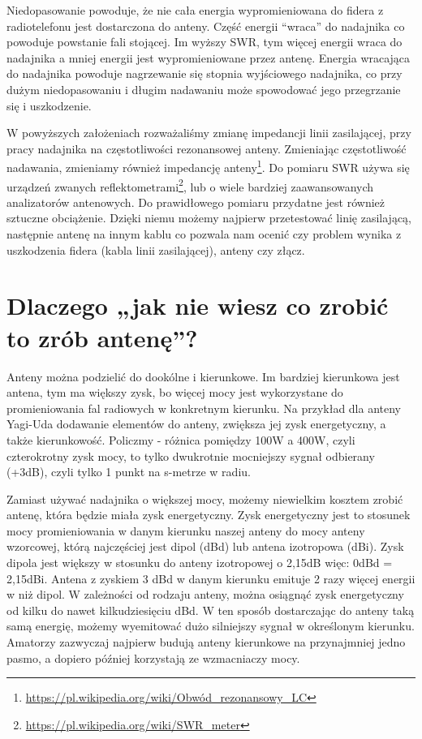 \documentclass[a4paper,12pt]{article}
\begin{document}
Niedopasowanie powoduje, że nie cała energia wypromieniowana do fidera z radiotelefonu jest dostarczona do anteny. Część energii “wraca” do nadajnika co powoduje powstanie fali stojącej. Im wyższy SWR, tym więcej energii wraca do nadajnika a mniej energii jest wypromieniowane przez antenę. Energia wracająca do nadajnika powoduje nagrzewanie się stopnia wyjściowego nadajnika, co przy dużym niedopasowaniu i długim nadawaniu może spowodować jego przegrzanie się i uszkodzenie.

W powyższych założeniach rozważaliśmy zmianę impedancji linii zasilającej, przy pracy nadajnika na częstotliwości rezonansowej anteny. Zmieniając częstotliwość nadawania, zmieniamy również impedancję anteny\footnote{\url{https://pl.wikipedia.org/wiki/Obwód_rezonansowy_LC}}.
Do pomiaru SWR używa się urządzeń zwanych reflektometrami\footnote{\url{https://pl.wikipedia.org/wiki/SWR_meter}}, lub o wiele bardziej zaawansowanych analizatorów antenowych.
Do prawidłowego pomiaru przydatne jest również sztuczne obciążenie. Dzięki niemu możemy najpierw przetestować linię zasilającą, następnie antenę na innym kablu co pozwala nam ocenić czy problem wynika z uszkodzenia fidera (kabla linii zasilającej), anteny czy złącz.

\section{Dlaczego „jak nie wiesz co zrobić to zrób antenę”?}
Anteny można podzielić do dookólne i kierunkowe. Im bardziej kierunkowa jest antena, tym ma większy zysk, bo więcej mocy jest wykorzystane do promieniowania fal radiowych w konkretnym kierunku. Na przykład dla anteny Yagi-Uda dodawanie elementów do anteny, zwiększa jej zysk energetyczny, a także kierunkowość.
Policzmy - różnica pomiędzy 100W a 400W, czyli czterokrotny zysk mocy, to tylko dwukrotnie mocniejszy sygnał odbierany (+3dB), czyli tylko 1 punkt na s-metrze w radiu. 

Zamiast używać nadajnika o większej mocy, możemy niewielkim kosztem zrobić antenę, która będzie miała zysk energetyczny. Zysk energetyczny jest to stosunek mocy promieniowania w danym kierunku naszej anteny do mocy anteny wzorcowej, którą najczęściej jest dipol (dBd) lub antena izotropowa (dBi). Zysk dipola jest większy w stosunku do anteny izotropowej o 2,15dB więc: 0dBd = 2,15dBi. Antena z zyskiem 3 dBd w danym kierunku emituje 2 razy więcej energii w niż dipol. W zależności od rodzaju anteny, można osiągnąć zysk energetyczny od kilku do nawet kilkudziesięciu dBd. W ten sposób dostarczając do anteny taką samą energię, możemy wyemitować dużo silniejszy sygnał w określonym kierunku. Amatorzy zazwyczaj najpierw budują anteny kierunkowe na przynajmniej jedno pasmo, a dopiero później korzystają ze wzmacniaczy mocy.
\end{document}
